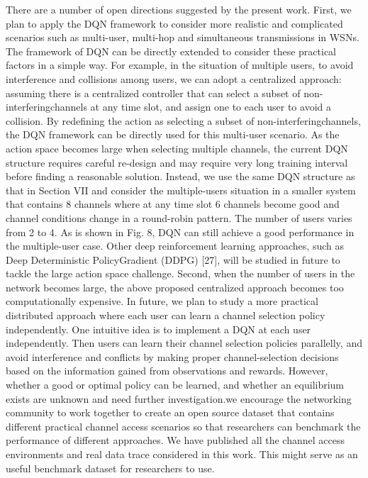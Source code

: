 There are a number of open directions suggested by the present work. First, we plan to apply the DQN framework to consider more realistic and complicated scenarios such as multi-user, multi-hop and simultaneous transmissions in WSNs. The framework of DQN can be directly extended to consider these practical factors in a simple way. For example, in the situation of multiple users, to avoid interference and collisions among users, we can adopt a centralized approach: assuming there is a centralized controller that can select a subset of non-interferingchannels at any time slot, and assign one to each user to avoid a collision. By redeﬁning the action as selecting a subset of non-interferingchannels, the DQN framework can be directly used for this multi-user scenario. As the action space becomes large when selecting multiple channels, the current DQN structure requires careful re-design and may require very long training interval before ﬁnding a reasonable solution. Instead, we use the same DQN structure as that in Section VII and consider the multiple-users situation in a smaller system that contains 8 channels where at any time slot 6 channels become good and channel conditions change in a round-robin pattern. The number of users varies from 2 to 4. As is shown in Fig. 8, DQN can still achieve a good performance in the multiple-user case. Other deep reinforcement learning approaches, such as Deep Deterministic PolicyGradient (DDPG) [27], will be studied in future to tackle the large action space challenge. Second, when the number of users in the network becomes large, the above proposed centralized approach becomes too computationally expensive. In future, we plan to study a more practical distributed approach where each user can learn a channel selection policy independently. One intuitive idea is to implement a DQN at each user independently. Then users can learn their channel selection policies parallelly, and avoid interference and conﬂicts by making proper channel-selection decisions based on the information gained from observations and rewards. However, whether a good or optimal policy can be learned, and whether an equilibrium exists are unknown and need further investigation.we encourage the networking community to work together to create an open source dataset that contains different practical channel access scenarios so that researchers can benchmark the performance of different approaches. We have published all the channel access environments and real data trace considered in this work.
This might serve as an useful benchmark dataset for researchers to use.


